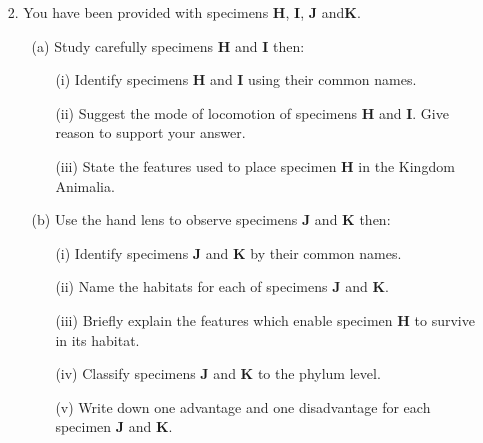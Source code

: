 \begin{enumerate}
\item[2.] You have been provided with specimens \textbf{H}, \textbf{I}, \textbf{J} and\textbf{K}.
\begin{enumerate}
\item[(a)] Study carefully specimens \textbf{H} and \textbf{I} then:
\begin{enumerate}
\item[(i)] Identify specimens \textbf{H} and \textbf{I} using their common names.
\item[(ii)] Suggest the mode of locomotion of specimens \textbf{H} and \textbf{I}. Give reason to support your answer.
\item[(iii)] State the features used to place specimen \textbf{H} in the Kingdom Animalia.
\end{enumerate}
\item[(b)] Use the hand lens to observe specimens \textbf{J} and \textbf{K} then:
\begin{enumerate}
\item[(i)] Identify specimens \textbf{J} and \textbf{K} by their common names.
\item[(ii)] Name the habitats for each of specimens \textbf{J} and \textbf{K}.
\item[(iii)] Briefly explain the features which enable specimen \textbf{H} to survive in its habitat.
\item[(iv)] Classify specimens \textbf{J} and \textbf{K} to the phylum level.
\item[(v)] Write down one advantage and one disadvantage for each specimen \textbf{J} and \textbf{K}.
\end{enumerate}
\end{enumerate}

\end{enumerate}